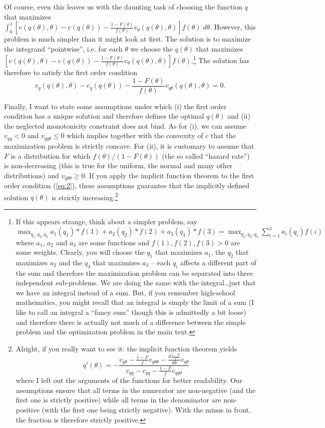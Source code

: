 \documentclass[12pt]{article}
\begin{document}
Of course, even this leaves us with the daunting task of choosing the function $q$ that maximizes $\int_0^1 [v(q(\theta ),\theta )-c(q(\theta ))-\frac{1-F(\theta )}{f(\theta )}v_\theta (q(\theta ),\theta )]f(\theta )\;d\theta$. However, this problem is much simpler than it might look at first. The solution is to maximize the integrand ``pointwise'', i.e. for each $\theta $ we choose the $q(\theta )$ that maximizes $[v(q(\theta ),\theta )-c(q(\theta ))-\frac{1-F(\theta )}{f(\theta )}v_\theta (q(\theta ),\theta )]f(\theta )$.\footnote{If this appears strange, think about a simpler problem, say $\max_{q_1,q_2,q_3} a_1(q_1)*f(1)+a_2(q_2)*f(2)+a_3(q_3)*f(3)=\max_{q_1,q_2,q_3}\sum_{i=1}^3a_i(q_i)f(i)$ where $a_1$, $a_2$ and $a_3$ are some functions and $f(1),f(2),f(3)>0$ are some weights. Clearly, you will choose the $q_1$ that maximizes $a_1$, the $q_2$ that maximizes $a_2$ and the $q_3$ that maximizes $a_3$ -- each $q_i$ affects a different part of the sum and therefore the maximization problem can be separated into three independent sub-problems. We are doing the same with the integral\dots just that we have an integral instead of a sum. But, if you remember high-school mathematics, you might recall that an integral is simply the limit of a sum (I like to call an integral a ``fancy sum'' though this is admittedly a bit loose) and therefore there is actually not much of a difference between the simple problem and the optimization problem in the main text.} The solution has therefore to satisfy the first order condition
\begin{equation}
v_q(q(\theta ),\theta )-c_q(q(\theta ))-\frac{1-F(\theta )}{f(\theta )}v_{q\theta }(q(\theta ),\theta )=0.\label{eq:2}
\end{equation}

Finally, I want to state some assumptions under which (i) the first order condition has a unique solution and therefore defines the optimal $q(\theta )$ and (ii) the neglected monotonicity constraint does not bind. As for (i), we can assume $v_{qq}< 0$ and $v_{qq\theta }\leq 0$ which implies together with the convexity of $c$ that the maximization problem is strictly concave. For (ii), it is customary to assume that $F$ is a distribution for which $f(\theta )/(1-F(\theta ))$ (the so called ``hazard rate'') is non-decreasing (this is true for the uniform, the normal and many other distributions) and $v_{q\theta \theta }\geq 0$. If you apply the implicit function theorem to the first order condition (\ref{eq:2}), these assumptions guarantee that the implicitly defined solution $q(\theta )$ is strictly increasing.\footnote{Alright, if you really want to see it: the implicit function theorem yields
$$q'(\theta )=-\frac{v_{q\theta }-\frac{1-F}{f}v_{q\theta \theta }-\frac{d\frac{1-F}{f}}{d\theta }v_{q\theta }}{v_{qq}-c_{qq}-\frac{1-F}{f}v_{qq\theta }}$$ where I left out the arguments of the functions for better readability. Our assumptions ensure that all terms in the numerator are non-negative (and the first one is strictly positive) while all terms in the denominator are non-positive (with the first one being strictly negative). With the minus in front, the fraction is therefore strictly positive.}
\end{document}
